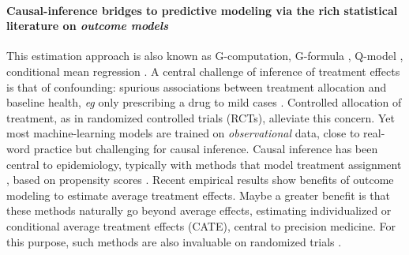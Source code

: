 \documentclass[french,12pt,twoside,a4paper]{book}
\begin{document}


\paragraph{Causal-inference bridges to predictive modeling via the rich
  statistical literature on \emph{outcome models}} This estimation approach is
also known as G-computation, G-formula \citep{robins_role_1986}, Q-model
\citep{snowden2011implementation}, conditional mean regression
\citep{wendling_comparing_2018}. A central challenge of inference of
treatment effects is that of confounding: spurious associations between
treatment allocation and baseline health, \emph{eg} only prescribing a drug
to mild cases \citep{hernan_causal_2020,vanderweele2019principles}.
Controlled allocation of treatment, as in randomized controlled trials
(RCTs), alleviate this concern. Yet most machine-learning models are trained
on \emph{observational} data, close to real-word practice
\citep{black1996we,hernan_methods_2021} but challenging for causal
inference. Causal inference has been central to epidemiology, typically with
methods that model treatment assignment
\citep{austin2015moving,grose_use_2020}, based on propensity scores
\citep{rosenbaum_central_1983}. Recent empirical results
\citep{wendling_comparing_2018,dorie_automated_2019} show benefits of
outcome modeling to estimate average treatment effects. Maybe a greater
benefit is that these methods naturally go beyond average effects,
estimating individualized or conditional average treatment effects (CATE),
central to precision medicine.
%
For this purpose, such methods are also invaluable on randomized trials
\citep{su2018random,lamont2018identification,hoogland2021tutorial}.
\end{document}
